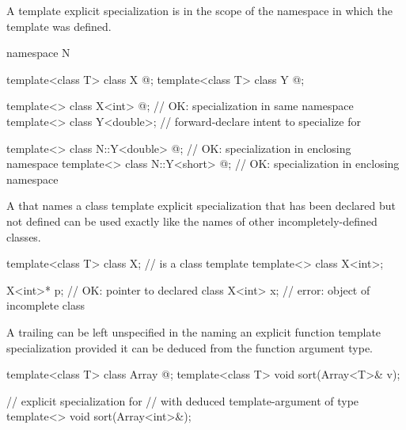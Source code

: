 \pnum
A template explicit specialization is in the scope of the namespace in which
the template was defined.
\begin{example}

\begin{codeblock}
namespace N {
  template<class T> class X { @\commentellip@ };
  template<class T> class Y { @\commentellip@ };

  template<> class X<int> { @\commentellip@ };        // OK: specialization in same namespace
  template<> class Y<double>;                   // forward-declare intent to specialize for 
}

template<> class N::Y<double> { @\commentellip@ };    // OK: specialization in enclosing namespace
template<> class N::Y<short> { @\commentellip@ };     // OK: specialization in enclosing namespace
\end{codeblock}
\end{example}

\pnum
A
that names a class template explicit specialization that has been declared but
not defined can be used exactly like the names of other incompletely-defined
classes.
\begin{example}

\begin{codeblock}
template<class T> class X;                      //  is a class template
template<> class X<int>;

X<int>* p;                                      // OK: pointer to declared class 
X<int> x;                                       // error: object of incomplete class 
\end{codeblock}
\end{example}

\pnum
A trailing
can be left unspecified in the
naming an explicit function template specialization
provided it can be deduced from the function argument type.
\begin{example}

\begin{codeblock}
template<class T> class Array { @\commentellip@ };
template<class T> void sort(Array<T>& v);

// explicit specialization for 
// with deduced template-argument of type 
template<> void sort(Array<int>&);
\end{codeblock}
\end{example}

